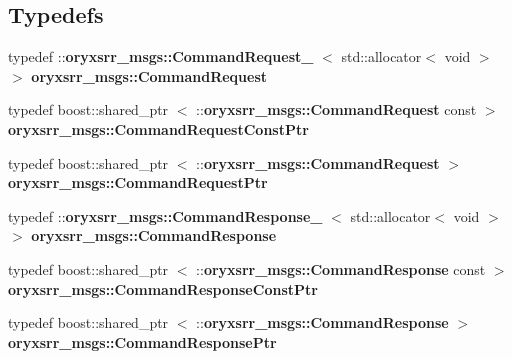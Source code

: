 \subsection*{\-Typedefs}
\begin{DoxyCompactItemize}
\item 
typedef \*
\-::{\bf oryxsrr\-\_\-msgs\-::\-Command\-Request\-\_\-}\*
$<$ std\-::allocator$<$ void $>$ $>$ {\bf oryxsrr\-\_\-msgs\-::\-Command\-Request}
\item 
typedef boost\-::shared\-\_\-ptr\*
$<$ \-::{\bf oryxsrr\-\_\-msgs\-::\-Command\-Request} \*
const  $>$ {\bf oryxsrr\-\_\-msgs\-::\-Command\-Request\-Const\-Ptr}
\item 
typedef boost\-::shared\-\_\-ptr\*
$<$ \-::{\bf oryxsrr\-\_\-msgs\-::\-Command\-Request} $>$ {\bf oryxsrr\-\_\-msgs\-::\-Command\-Request\-Ptr}
\item 
typedef \*
\-::{\bf oryxsrr\-\_\-msgs\-::\-Command\-Response\-\_\-}\*
$<$ std\-::allocator$<$ void $>$ $>$ {\bf oryxsrr\-\_\-msgs\-::\-Command\-Response}
\item 
typedef boost\-::shared\-\_\-ptr\*
$<$ \-::{\bf oryxsrr\-\_\-msgs\-::\-Command\-Response} \*
const  $>$ {\bf oryxsrr\-\_\-msgs\-::\-Command\-Response\-Const\-Ptr}
\item 
typedef boost\-::shared\-\_\-ptr\*
$<$ \-::{\bf oryxsrr\-\_\-msgs\-::\-Command\-Response} $>$ {\bf oryxsrr\-\_\-msgs\-::\-Command\-Response\-Ptr}
\end{DoxyCompactItemize}
